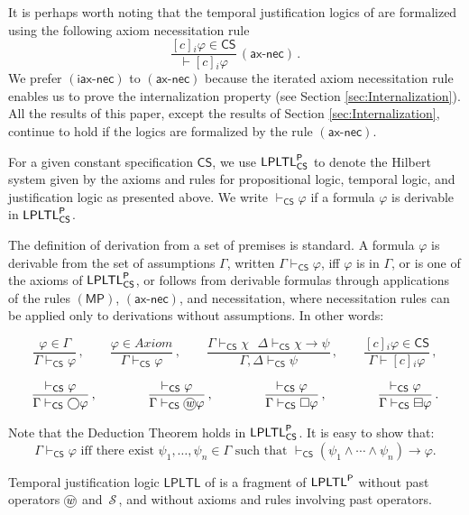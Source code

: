 \documentclass[envcountsect,envcountsame,oribibl,orivec]{llncs}
\newcommand*\circled[1]{\tikz[baseline=(char.base)]{
		\node[shape=circle,draw,inner sep=0.4pt] (char) {#1};}}
\newcommand{\lrule}[2]{\displaystyle{\frac{#1}{#2}}}
\newcommand{\mprule}{\ensuremath{(\textsf{MP})}}
\newcommand{\lnext}{\bigcirc}
\newcommand{\lalways}{\Box}
\newcommand{\lsofar}{\boxminus}
\newcommand{\lsince}{{\,\mathcal{S}\,}}
\newcommand{\wprevious}{\circled{\textit{w}}}
\newcommand{\necrule}{\ensuremath{\textsf{-nec}}}
\newcommand{\LPLTLp}{\textsf{LPLTL}^{\sf P}}
\newcommand{\LPLTL}{\textsf{LPLTL}}
\newcommand{\jbox}[1]{\left[#1\right]\!}
\newcommand{\constnecrule}{\ensuremath{(\textsf{ax}\necrule)}}
\newcommand{\iteratedconstnecrule}{\ensuremath{(\textsf{iax}\necrule)}}
\newcommand{\CS}{\textsf{CS}}
\newcommand{\agent}{i}
\renewcommand{\phi}{\varphi}
\begin{document}
\begin{remark}
	It is perhaps worth noting that the temporal justification logics of \cite{Bucheli15, BucheliGhariStuder2017} are formalized using the following axiom necessitation rule
	 \[
	   \lrule{\jbox{c}_\agent \phi \in \CS}{\vdash \jbox{c}_\agent \phi}\, \constnecrule \, .
	 \]
	 We prefer $\iteratedconstnecrule$ to $\constnecrule$ because the iterated axiom necessitation rule enables us to prove the internalization property (see Section \ref{sec:Internalization}). All the results of this paper, except the results of Section \ref{sec:Internalization}, continue to hold if the logics are formalized by the rule $\constnecrule$.
\end{remark}

For a given constant specification $\CS$, we use $\LPLTLp_\CS$ to denote the Hilbert system given by the axioms and rules for propositional logic, temporal logic, and justification logic as presented above.
We write $\vdash_\CS \phi$  if a formula $\phi$ is derivable in $\LPLTLp_\CS$.
 
The definition of derivation from a set of premises is standard. A formula $\phi$ is derivable from the set of assumptions $\Gamma$, written $\Gamma \vdash_\CS \phi$, iff $\phi$ is in $\Gamma$, or is one of the axioms of $\LPLTLp_\CS$, or follows from derivable formulas through applications of the rules $\mprule$, $\constnecrule$, and necessitation, where  necessitation rules can be applied only to derivations without assumptions. In other words: 

\[ \frac{\phi \in \Gamma}{\Gamma \vdash_\CS \phi} \, , \qquad
\frac{\phi \in Axiom}{\Gamma \vdash_\CS \phi} \, , \qquad
\frac{\Gamma \vdash_\CS \chi~~~\Delta \vdash_\CS \chi \rightarrow \psi}{\Gamma,\Delta \vdash_\CS \psi} \, , \qquad \lrule{\jbox{c}_\agent \phi \in \CS}{\Gamma \vdash \jbox{c}_\agent \phi} \, ,\]

\[  \lrule{\vdash_\CS \phi}{\Gamma \vdash_\CS \lnext \phi} \, ,  \qquad\qquad \lrule{\vdash_\CS \phi}{\Gamma \vdash_\CS \wprevious \phi} \, , \qquad\qquad \lrule{\vdash_\CS \phi}{\Gamma \vdash_\CS \lalways\phi} \, , \qquad\qquad \lrule{\vdash_\CS \phi}{\Gamma \vdash_\CS \lsofar\phi} \,.
\]

Note that the Deduction Theorem holds in $\LPLTLp_\CS$. It is easy to show that:
%
\[
\Gamma \vdash_\CS \phi \text{ iff there exist $\psi_1,\ldots,\psi_n \in \Gamma$ such that 
	$\vdash_\CS (\psi_1 \land \cdots \land \psi_n) \to \phi$.}
\]


Temporal justification logic $\LPLTL$ of \cite{BucheliGhariStuder2017} is a fragment of $\LPLTLp$ without past operators $\wprevious$ and $\lsince$, and without axioms and rules involving past operators.
\end{document}
